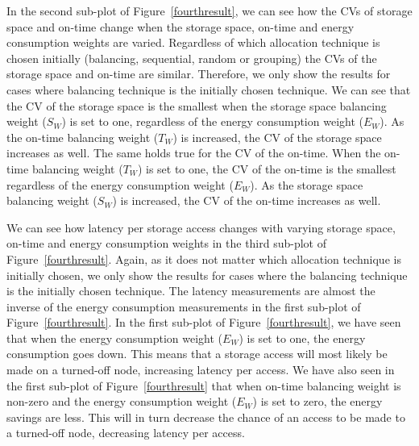 In the second sub-plot of Figure~\ref{fourthresult}, we can see how the CVs of storage space and
on-time change when the storage space, on-time and energy consumption weights are varied. Regardless of
which allocation technique is chosen initially (balancing, sequential, random or grouping) the CVs of the
storage space and on-time are similar. Therefore, we only show the results for cases where balancing technique
is the initially chosen technique. We can see that the CV of the storage space is the smallest when the storage space
balancing weight ($S_W$) is set to one, regardless of the energy consumption weight ($E_W$). As the on-time
balancing weight ($T_W$) is increased, the CV of the storage space increases as well. The same holds true
for the CV of the on-time. When the on-time balancing weight ($T_W$) is set to one, the CV of the on-time
is the smallest regardless of the energy consumption weight ($E_W$). As the storage space balancing
weight ($S_W$) is increased, the CV of the on-time increases as well.

We can see how latency per storage access changes with varying storage space, on-time and energy consumption
weights in the third sub-plot of Figure~\ref{fourthresult}. Again, as it does not matter which allocation technique
is initially chosen, we only show the results for cases where the balancing technique is the initially chosen
technique. The latency
measurements are almost the inverse of the energy consumption measurements in the first sub-plot of
Figure~\ref{fourthresult}. In the first sub-plot of Figure~\ref{fourthresult}, we have seen that when the energy
consumption weight ($E_W$) is set to one, the energy consumption goes down. This means that a storage access
will most likely be made on a turned-off node, increasing latency per access. We have also seen in the
first sub-plot of Figure~\ref{fourthresult} that when on-time balancing weight is non-zero and the energy
consumption weight ($E_W$) is set to zero, the energy savings are less. This will in turn
decrease the chance of an access to be made to a turned-off node, decreasing latency per access.

